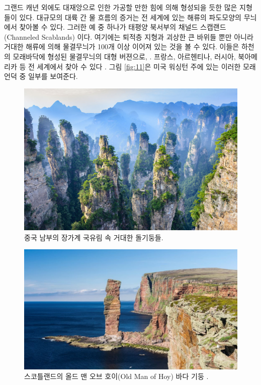 \documentclass[10pt,twocolumn,letterpaper]{article}
\begin{document}
그랜드 캐년 외에도 대재앙으로 인한 가공할 만한 힘에 의해 형성되을 듯한 많은 지형들이 있다. 대규모의 대륙 간 물 흐름의 증거는 전 세계에 있는 해류의 파도모양의 무늬에서 찾아볼 수 있다. 그러한 예 중 하나가 태평양 북서부의 채널드 스캡랜드(Channeled Scablands) 이다. 여기에는 퇴적층 지형과 괴상한  큰 바위들 뿐만 아니라  거대한 해류에 의해 물결무늬가 100개 이상 이어져 있는 것을 볼 수 있다. 이들은 하천의 모래바닥에 형성된 물결무늬의 대형 버젼으로, \cite{78,79}.  프랑스, 아르헨티나, 러시아, 북아메리카 등 전 세계에서 찾아 수 있다 \cite{81}. 그림 \ref{fig:11}은 미국 워싱턴 주에 있는 이러한 모래 언덕 중 일부를 보여준다\cite{80}.

\begin{figure}[t]
\begin{center}
   \includegraphics[width=1\linewidth]{zhangjiajie.jpg}
\end{center}
   \caption{중국 남부의  장가계 국유림 속 거대한 돌기둥들.}
\label{fig:12}
\label{fig:onecol}
\end{figure}

\begin{figure}[t]
\begin{center}
   \includegraphics[width=1\linewidth]{hoy.jpg}
\end{center}
   \caption{스코틀랜드의 올드 맨 오브 호이(Old Man of Hoy) 바다 기둥 \cite{83}.}
\label{fig:13}
\label{fig:onecol}
\end{figure}
\end{document}
